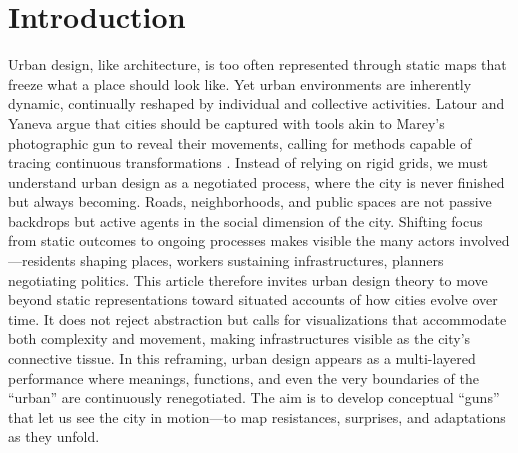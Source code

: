 \documentclass[land,article,accept,pdftex,oneauthor]{Definitions/mdpi}
\begin{document}

\section{Introduction
}
{Urban} %
design, like architecture, is too often represented through static maps that freeze what a place should look like. Yet urban environments are inherently dynamic, continually reshaped by individual and collective activities. Latour and Yaneva argue that cities should be captured with tools akin to Marey’s photographic gun to reveal their movements, calling for methods capable of tracing continuous transformations \cite{latour_give_2008}. Instead of relying on rigid grids, we must understand urban design as a negotiated process, where the city is never finished but always becoming. Roads, neighborhoods, and public spaces are not passive backdrops but active agents in the social dimension of the city. Shifting focus from static outcomes to ongoing processes makes visible the many actors \mbox{involved---residents} shaping places, workers sustaining infrastructures, planners negotiating politics. This article therefore invites urban design theory to move beyond static representations toward situated accounts of how cities evolve over time. It does not reject abstraction but calls for visualizations that accommodate both complexity and movement, making infrastructures visible as the city’s connective tissue. In this reframing, urban design appears as a multi-layered performance where meanings, functions, and even the very boundaries of the “urban” are continuously renegotiated. The aim is to develop conceptual “guns” that let us see the city in motion---to map resistances, surprises, and adaptations as they unfold.
\end{document}

